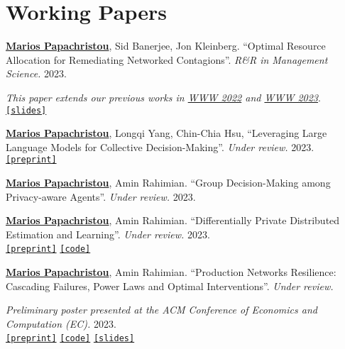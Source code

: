 \documentclass[margin]{res}
\newcommand{\specialurl}[2]{\href {#2} {\texttt{[#1]}}}
\newcommand{\preprint}[1]{\specialurl {preprint} {#1}}
\newcommand{\code}[1]{\specialurl {code} {#1}}
\newcommand{\slides}[1]{\specialurl {slides} {#1}}
\newcommand{\authorref}[1]{\underline {\textbf{#1}}}
\newcommand{\authorme}{\authorref{Marios Papachristou}}
\begin{document}
\begin{resume}
\begin{enumerate}[nosep, label={[P\arabic*]}]
\end{enumerate}

\section{Working Papers}


\begin{enumerate}[nosep, label={[W\arabic*]}]   

   \item \authorme, Sid Banerjee, Jon Kleinberg. ``Optimal Resource Allocation for Remediating Networked Contagions''. \emph{R\&R in Management Science.} 2023.
   
   \emph{This paper extends our previous works in \href{https://doi.org/10.1145/3485447.3512047}{WWW 2022} and \href{https://arxiv.org/abs/2205.13394}{WWW 2023}}. \\
       \slides{https://drive.google.com/file/d/1DgOCnJ5Pf3Je-F7a-Adiy2TTZ7oZUbbB/view?usp=sharing}

   \item \authorme, Longqi Yang, Chin-Chia Hsu, ``Leveraging Large Language Models for Collective Decision-Making''. \emph{Under review.} 2023. \\
  	\preprint{https://arxiv.org/abs/2311.04928}

   \item \authorme, Amin Rahimian. ``Group Decision-Making among Privacy-aware Agents''. \emph{Under review.} 2023.

   \item \authorme, Amin Rahimian. ``Differentially Private Distributed Estimation and Learning''. \emph{Under review.} 2023. \\
   	   \preprint{https://arxiv.org/abs/2306.15865} \code{https://github.com/papachristoumarios/dp-distributed-estimation}
   \item \authorme, Amin Rahimian. ``Production Networks Resilience: Cascading Failures, Power Laws and Optimal Interventions''. \emph{Under review.} 
   
   \emph{Preliminary poster presented at the ACM Conference of Economics and Computation (EC).} 2023. \\ \preprint{https://papers.ssrn.com/sol3/papers.cfm?abstract_id=4392226} \code{https://github.com/papachristoumarios/supply-chain-resilience} \slides{https://docs.google.com/presentation/d/1x5IcLvLxY31GME19li0HUgktC9HlEe2u/edit?usp=sharing&ouid=109899272296285628946&rtpof=true&sd=true}
 
   
     

\end{enumerate}
\end{resume}
\end{document}

